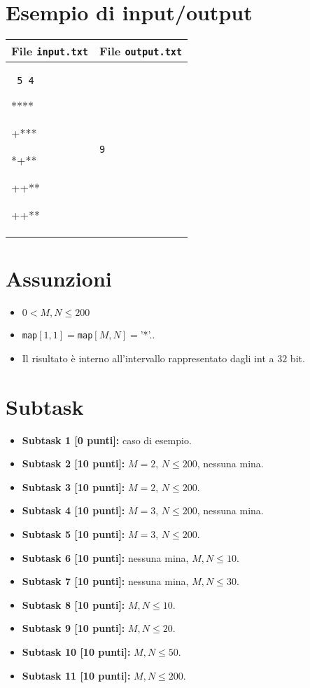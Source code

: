 \documentclass[a4paper,11pt]{article}
\newcommand{\file}[1]{\texttt{#1}}
\newcommand{\esempio}[2]{
\noindent\begin{minipage}{\textwidth}
\begin{tabular}{|p{11cm}|p{5cm}|}
	\hline
	\textbf{File \file{input.txt}} & \textbf{File \file{output.txt}}\\
	\hline
	\tt \small #1 &
	\tt \small #2 \\
	\hline
\end{tabular}
\end{minipage}
}
\begin{document}
\section*{Esempio di input/output}
\esempio{
5 4

****

+***

*+**

++**

++**
}{9}


\section*{Assunzioni}
\begin{itemize}
\item $0 < M,N \leq 200$
\item \file{map}$[1,1]=$\file{map}$[M,N]=$'*'..
\item Il risultato è interno all'intervallo rappresentato dagli int a $32$ bit.

\end{itemize}

\section*{Subtask}
\begin{itemize}
\item \textbf{Subtask 1 [\phantom{1}0 punti]:} caso di esempio.
\item \textbf{Subtask 2 [10 punti]:} $M = 2$, $N \leq 200$, nessuna mina.
\item \textbf{Subtask 3 [10 punti]:} $M = 2$, $N \leq 200$.
\item \textbf{Subtask 4 [10 punti]:} $M = 3$, $N \leq 200$, nessuna mina.
\item \textbf{Subtask 5 [10 punti]:} $M = 3$, $N \leq 200$.
\item \textbf{Subtask 6 [10 punti]:} nessuna mina, $M,N \leq 10$.
\item \textbf{Subtask 7 [10 punti]:} nessuna mina, $M,N \leq 30$.
\item \textbf{Subtask 8 [10 punti]:} $M,N \leq 10$.
\item \textbf{Subtask 9 [10 punti]:} $M,N \leq 20$.
\item \textbf{Subtask 10 [10 punti]:} $M,N \leq 50$.
\item \textbf{Subtask 11 [10 punti]:} $M,N \leq 200$.  
\end{itemize}
\end{document}
